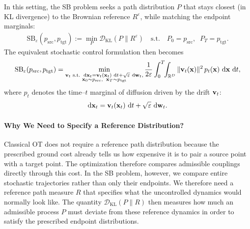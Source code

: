 In this setting, the SB problem seeks a path distribution $P$ that stays closest
(in KL divergence) to the Brownian reference $R^\varepsilon$, while matching the
endpoint marginals:
\begin{align}\label{eq:sb-epsilon}
    \mathrm{SB}_\varepsilon(p_{\mathrm{src}}, p_{\mathrm{tgt}})
    := \min_{P} \mathcal{D}_{\mathrm{KL}}(P \| R^\varepsilon)
    \quad \text{s.t.} \quad P_0 = p_{\mathrm{src}}, \;\; P_T = p_{\mathrm{tgt}}.
\end{align}
The equivalent stochastic control formulation then becomes
\begin{align}\label{eq:sb-epsilon-kinetic}
\begin{aligned}
    \mathrm{SB}_\varepsilon(p_{\mathrm{src}}, p_{\mathrm{tgt}})
    = \min_{\substack{
        {\mathbf{v}}_t \text{ s.t. } \mathop{}\!\mathrm{d} {\mathbf{x}}_t = {\mathbf{v}}_t({\mathbf{x}}_t)\,\mathop{}\!\mathrm{d} t + \sqrt{\varepsilon}\,\mathop{}\!\mathrm{d} {\mathbf{w}}_t, \\
        {\mathbf{x}}_0 \sim p_{\mathrm{src}},\;\; {\mathbf{x}}_T \sim p_{\mathrm{tgt}}
    }}
    \frac{1}{2\varepsilon}\int_0^T \!\!\int_{\mathbb{R}^D}
        \|{\mathbf{v}}_t({\mathbf{x}})\|^2 \, p_t({\mathbf{x}})\,\mathop{}\!\mathrm{d} {\mathbf{x}}\,\mathop{}\!\mathrm{d} t,
\end{aligned}
\end{align}
where $p_t$ denotes the time--$t$ marginal of diffusion driven by the drift ${\mathbf{v}}_t$:
\[
\mathop{}\!\mathrm{d} {\mathbf{x}}_t = {\mathbf{v}}_t({\mathbf{x}}_t)\,\mathop{}\!\mathrm{d} t + \sqrt{\varepsilon}\,\mathop{}\!\mathrm{d} {\mathbf{w}}_t.
\]



\paragraph{Why We Need to Specify a Reference Distribution?}
Classical OT does not require a reference path distribution because the
prescribed ground cost already tells us how expensive it is to pair a source
point with a target point. The optimization therefore compares admissible
couplings directly through this cost. In the SB problem, however, we compare
entire stochastic trajectories rather than only their endpoints. We therefore
need a reference path measure $R$ that specifies what the uncontrolled
dynamics would normally look like. The quantity
$\mathcal{D}_{\mathrm{KL}}(P\|R)$ then measures how much an admissible process
$P$ must deviate from these reference dynamics in order to satisfy the
prescribed endpoint distributions.



